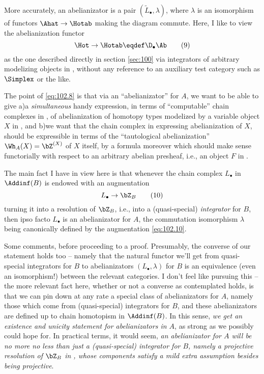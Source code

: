 More accurately, an abelianizator is a pair $(\widetilde L_\bullet,\lambda)$,
where $\lambda$ is an isomorphism of functors $\Ahat\to\Hotab$ making
the diagram commute. Here, I like to view the abelianization functor
\begin{equation}
  \label{eq:102.9}
  \Hot\to\Hotab\eqdef\D_\bullet\Ab\tag{9}
\end{equation}
as the one described directly in section \ref{sec:100} via integrators
of arbitrary modelizing objects in \Cat, without any reference to an
auxiliary test category such as $\Simplex$ or the like.

The point of \eqref{eq:102.8} is that via an ``abelianizator'' for
$A$, we want to be able to give a)\enspace a \emph{simultaneous} handy
expression, in terms of ``computable'' chain complexes in \Ab,
of abelianization of homotopy types modelized by a
variable object $X$ in \Ahat, and b)\enspace we want that the chain
complex in \Ab{} expressing abelianization of $X$, should be
expressible in terms of the ``tautological abelianization'' $\Wh_A(X)
= \bZ^{(X)}$ of $X$ itself, by a formula moreover which should make
sense functorially with respect to an arbitrary abelian presheaf,
i.e., an object $F$ in \Ahatab.

The main fact I have in view here is that whenever the chain complex
$L_\bullet$ in $\Addinf(B)$ is endowed with an augmentation
\begin{equation}
  \label{eq:102.10}
  L_\bullet\to\bZ_B\tag{10}
\end{equation}
turning it into a resolution of $\bZ_B$, i.e., into a (quasi-special)
\emph{integrator} for $B$, then ipso facto $L_\bullet$ is an
abelianizator for $A$, the commutation isomorphism $\lambda$ being
canonically defined by the augmentation \eqref{eq:102.10}.

Some comments, before proceeding to a proof. Presumably, the converse
of our statement holds too -- namely that the natural functor we'll
get from quasi-special integrators for $B$ to abelianizators
$(L_\bullet,\lambda)$ for $B$ is an equivalence (even an isomorphism!)
between the relevant categories. I don't feel like pursuing this --
the more relevant fact here, whether or not a converse as contemplated
holds, is that we can pin down at any rate a special class of
abelianizators for $A$, namely those which come from (quasi-special)
integrators for $B$, and these abelianizators are defined up to chain
homotopism in $\Addinf(B)$. In this sense, \emph{we get an existence
  and unicity statement for abelianizators in $A$}, as strong as we
possibly could hope for. In practical terms, it would seem, \emph{an
  abelianizator for $A$ will be no more no less than just a
  \textup(quasi-special\textup) integrator for $B$, namely a
  projective resolution of $\bZ_B$ in \Bhatab, whose components
  satisfy a mild extra assumption besides being projective}.

